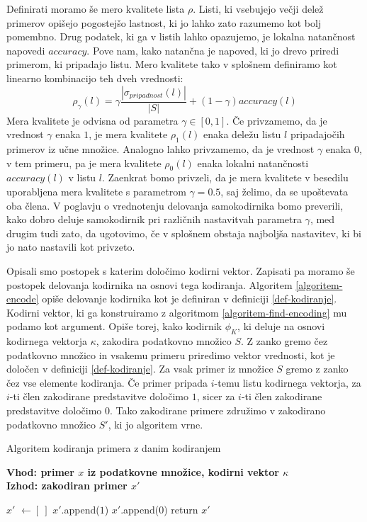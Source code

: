 \documentclass[12pt,a4paper]{article}
\begin{document}
Definirati moramo še mero kvalitete lista $\rho$. 
Listi, ki vsebujejo večji delež primerov opišejo pogostejšo lastnost, ki jo lahko zato razumemo kot bolj pomembno. 
Drug podatek, ki ga v listih lahko opazujemo, je lokalna natančnost napovedi $\mathit{accuracy}$.
Pove nam, kako natančna je napoved, ki jo drevo priredi primerom, ki pripadajo listu.
Mero kvalitete tako v splošnem definiramo kot linearno kombinacijo teh dveh vrednosti:
\[
\rho_{\gamma}(l) = \gamma \frac{|\sigma_{\mathit{pripadnost}}(l)|}{|S|} + (1-\gamma) \mathit{accuracy}(l)
\]
Mera kvalitete je odvisna od parametra $\gamma \in [0,1]$.
Če privzamemo, da je vrednost $\gamma$ enaka $1$, je mera kvalitete $\rho_1(l)$ enaka deležu listu $l$ pripadajočih primerov iz učne množice.
Analogno lahko privzamemo, da je vrednost $\gamma$ enaka $0$, v tem primeru, pa je mera kvalitete $\rho_0(l)$ enaka lokalni natančnosti $\mathit{accuracy}(l)$ v listu $l$.
Zaenkrat bomo privzeli, da je mera kvalitete v besedilu uporabljena mera kvalitete s parametrom $\gamma=0.5$, saj želimo, da se upoštevata oba člena.
V poglavju o vrednotenju delovanja samokodirnika bomo preverili, kako dobro deluje samokodirnik pri različnih nastavitvah parametra $\gamma$,
med drugim tudi zato, da ugotovimo, če v splošnem obstaja najboljša nastavitev, ki bi jo nato nastavili kot privzeto.

Opisali smo postopek s katerim določimo kodirni vektor. Zapisati pa moramo še postopek delovanja kodirnika na osnovi tega kodiranja.
Algoritem \ref{algoritem-encode} opiše delovanje kodirnika kot je definiran v definiciji \ref{def-kodiranje}. 
Kodirni vektor, ki ga konstruiramo z algoritmom \ref{algoritem-find-encoding} mu podamo kot argument.
Opiše torej, kako kodirnik $\phi_K$, ki deluje na osnovi kodirnega vektorja $\kappa$, zakodira podatkovno množico $S$. 
Z zanko gremo čez podatkovno množico in vsakemu primeru priredimo vektor vrednosti, kot je določen v definiciji \ref{def-kodiranje}.
Za vsak primer iz množice $S$ gremo z zanko čez vse elemente kodiranja. 
Če primer pripada $i$-temu listu kodirnega vektorja, za $i$-ti člen zakodirane predstavitve določimo $1$, sicer za $i$-ti člen zakodirane predstavitve določimo $0$.
Tako zakodirane primere združimo v zakodirano podatkovno množico $S'$, ki jo algoritem vrne.

\begin{algorithm}[ht]
  \caption{Algoritem kodiranja primera z danim kodiranjem}
  \label{algoritem-encode}
  \raggedright
  \textbf{Vhod: primer $x$ iz podatkovne množice, kodirni vektor $\kappa$}  \\
  \textbf{Izhod: zakodiran primer $x'$} 
  \begin{algorithmic}[1]
	\State $x'$ $\gets [\ ]$
			\State $x'$.append($1$)
		\Else
			\State $x'$.append($0$)
		\EndIf
	\EndFor
	\State return $x'$
  \end{algorithmic}
\end{algorithm}
\end{document}
